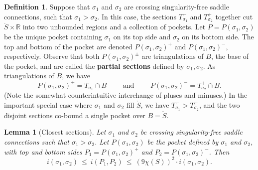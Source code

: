 \documentclass[11pt,letterpaper]{amsart}
\newcommand{\RR}[0]{\mathbb{R}}
\newcommand{\mr}{\mathring}
\numberwithin{equation}{section}
\newtheorem{lemma}[theorem]{Lemma}
\theoremstyle{definition}
\newtheorem{definition}[theorem]{Definition}
\newcommand{\define}[1]{\textbf{#1}}
\begin{document}
\begin{definition}\label{Def:PartialSections}
Suppose that $\sigma_1$ and $\sigma_2$ are crossing singularity-free saddle connections, such that $\sigma_1 > \sigma_2$. 
In this case, the sections $T^-_{\sigma_1}$ and $T^+_{\sigma_2}$ together cut $\mr S \times \RR$ into  two unbounded regions and a collection of pockets. 
Let $P = P(\sigma_1, \sigma_2)$ be the unique pocket containing $\sigma_1$ on its top side and $\sigma_2$ on its bottom side. The top and bottom of the pocket are denoted $P(\sigma_1, \sigma_2)^+$ and $P(\sigma_1, \sigma_2)^-$, respectively.
Observe that both $P(\sigma_1, \sigma_2)^\pm$ are triangulations of $B$, the base of the pocket, and are called the \define{partial sections} defined by $\sigma_1, \sigma_2$.
% 
As triangulations of $B$, we have
\begin{equation}\label{Eqn:ReversePlusMinus}
P(\sigma_1, \sigma_2)^+ = T^-_{\sigma_1} \cap B \qquad  \text{ and } \qquad P(\sigma_1, \sigma_2)^- =  T^+_{\sigma_2} \cap B.
\end{equation}
(Note the somewhat counterintuitive interchange of pluses and minuses.) 
In the important special case where $\sigma_1$ and $\sigma_2$ fill $\mr S$, we have $T^-_{\sigma_1} > T^+_{\sigma_2}$, and the two disjoint sections co-bound a single pocket over $B = \mr S$.
\end{definition}


\begin{lemma}[Closest sections]\label{Lem:ClosestPartialSections}
Let $\sigma_1$ and $\sigma_2$ be crossing singularity-free saddle connections such that   $\sigma_1  > \sigma_2$.
Let $P(\sigma_1, \sigma_2)$ be the pocket defined by $\sigma_1$ and $\sigma_2$, with top and bottom sides
$P_1 = P(\sigma_1, \sigma_2)^+$ and $P_2 = P(\sigma_1, \sigma_2)^-$.
Then 
\[
 i(\sigma_1,\sigma_2) \: \leq \: i(P_1,P_2) \: \leq \: (9 \chi(S))^2 \cdot i(\sigma_1,\sigma_2).
 \]
\end{lemma}
\end{document}
